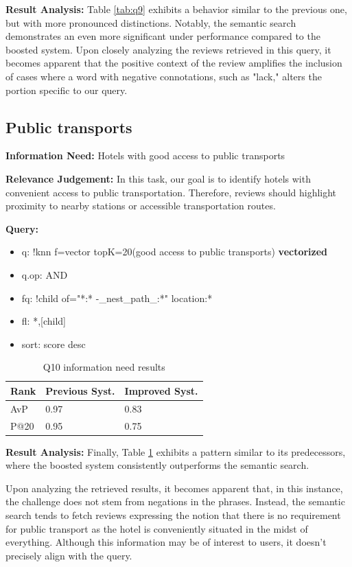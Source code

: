 \documentclass[sigconf]{acmart}
\begin{document}
\textbf{Result Analysis:} Table \ref{tab:q9} exhibits a behavior similar to the previous one, but with more pronounced distinctions. Notably, the semantic search demonstrates an even more significant under performance compared to the boosted system. 
Upon closely analyzing the reviews retrieved in this query, it becomes apparent that the positive context of the review amplifies the inclusion of cases where a word with negative connotations, such as "lack," alters the portion specific to our query.
\subsection{Public transports}

\textbf{Information Need:} Hotels with good access to public transports

\textbf{Relevance Judgement:} In this task, our goal is to identify hotels with convenient access to public transportation. Therefore, reviews should highlight proximity to nearby stations or accessible transportation routes.

\textbf{Query:}

\begin{itemize}
    \item q: {!knn f=vector topK=20}(good access to public transports) \textbf{vectorized}
    \item q.op: AND
    \item fq: {!child of="*:* -\_nest\_path\_:*"} location:*
    \item fl: *,[child]
    \item sort: score desc
\end{itemize}

\begin{table}[H]
\caption{Q10 information need results}
\label{tab:q10}
\begin{tabular}{lll}
\toprule
Rank & Previous Syst. & Improved Syst.\\
\midrule
AvP & 0.97 & 0.83  \\
P@20 & 0.95 & 0.75 \\
\bottomrule
\end{tabular}
\end{table}

\textbf{Result Analysis:} Finally, Table \ref{tab:q10} exhibits a pattern similar to its predecessors, where the boosted system consistently outperforms the semantic search.

Upon analyzing the retrieved results, it becomes apparent that, in this instance, the challenge does not stem from negations in the phrases. Instead, the semantic search tends to fetch reviews expressing the notion that there is no requirement for public transport as the hotel is conveniently situated in the midst of everything. Although this information may be of interest to users, it doesn't precisely align with the query.
\end{document}
